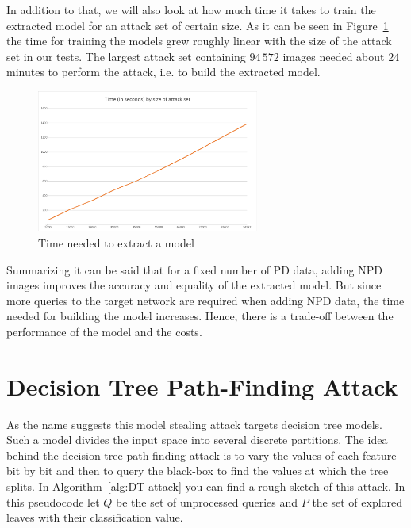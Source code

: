 \documentclass[a4paper,11pt]{article}
\begin{document}
        In addition to that, we will also look at how much time it takes to train the extracted model for an attack set of certain size. As it can be seen in Figure~\ref{fig:time_cat} the time for training the models grew roughly linear with the size of the attack set in our tests. The largest attack set containing $94\,572$ images needed about $24$ minutes to perform the attack, i.e. to build the extracted model.
        
        \begin{figure}[h!]
            \centering      \includegraphics[width=0.65\textwidth]{exercise_3/paper/images/Time_copy_cat.png}
            \caption{Time needed to extract a model}
            \label{fig:time_cat}
        \end{figure}
        
        Summarizing it can be said that for a fixed number of PD data, adding NPD images improves the accuracy and equality of the extracted model. But since more queries to the target network are required when adding NPD data, the time needed for building the model increases. Hence, there is a trade-off between the performance of the model and the costs.
        
            
\section{Decision Tree Path-Finding Attack}
    As the name suggests this model stealing attack targets decision tree models. Such a model divides the input space into several discrete partitions. The idea behind the decision tree path-finding attack is to vary the values of each feature bit by bit and then to query the black-box to find the values at which the tree splits. In Algorithm~\ref{alg:DT-attack} you can find a rough sketch of this attack. In this pseudocode let $Q$ be the set of unprocessed queries and $P$ the set of explored leaves with their classification value.
    
\end{document}
